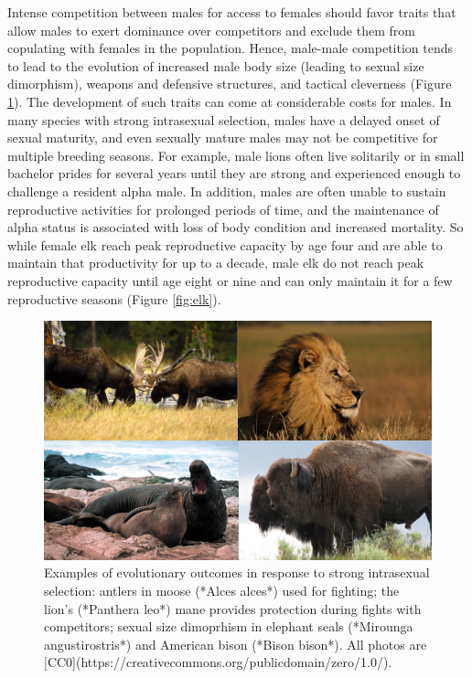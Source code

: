 \documentclass[
]{book}
\begin{document}
Intense competition between males for access to females should favor traits that allow males to exert dominance over competitors and exclude them from copulating with females in the population. Hence, male-male competition tends to lead to the evolution of increased male body size (leading to sexual size dimorphism), weapons and defensive structures, and tactical cleverness (Figure \ref{fig:sexdim}). The development of such traits can come at considerable costs for males. In many species with strong intrasexual selection, males have a delayed onset of sexual maturity, and even sexually mature males may not be competitive for multiple breeding seasons. For example, male lions often live solitarily or in small bachelor prides for several years until they are strong and experienced enough to challenge a resident alpha male. In addition, males are often unable to sustain reproductive activities for prolonged periods of time, and the maintenance of alpha status is associated with loss of body condition and increased mortality. So while female elk reach peak reproductive capacity by age four and are able to maintain that productivity for up to a decade, male elk do not reach peak reproductive capacity until age eight or nine and can only maintain it for a few reproductive seasons (Figure \ref{fig:elk}).

\begin{figure}
\includegraphics[width=1\linewidth]{images/sexdim} \caption{Examples of evolutionary outcomes in response to strong intrasexual selection: antlers in moose (*Alces alces*) used for fighting; the lion's (*Panthera leo*) mane provides protection during fights with competitors; sexual size dimoprhism in elephant seals (*Mirounga angustirostris*) and American bison (*Bison bison*). All photos are [CC0](https://creativecommons.org/publicdomain/zero/1.0/).}\label{fig:sexdim}
\end{figure}
\end{document}
